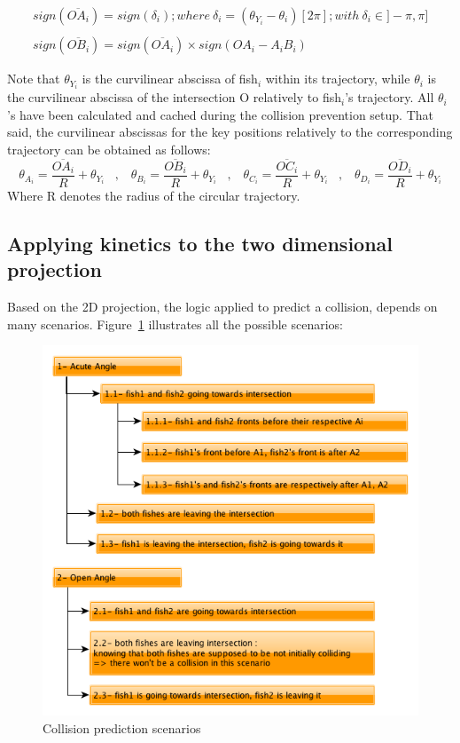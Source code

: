 \begin{gather*}
sign(\overline{OA_i}) = sign(\delta_i); where\: \delta_i = (\theta_{Y_i} - \theta_i) [2\pi]; with \: \delta_i \in ]-\pi, \pi]\\\\
sign(\overline{OB_i}) = sign(\overline{OA_i}) \times sign(OA_i - A_iB_i)
\end{gather*}

Note that $\theta_{Y_i}$ is the curvilinear abscissa of fish$_i$ within its trajectory, while $\theta_i$ is the curvilinear abscissa of the intersection O relatively to fish$_i$'s trajectory. All $\theta_i$'s have been calculated and cached during the collision prevention setup. That said, the curvilinear abscissas for the key positions relatively to the corresponding trajectory can be obtained as follows:
\[
\theta_{A_i} = \frac{\overline{OA_i}}{R} + \theta_{Y_i} \;\;\; , \;\;\; \theta_{B_i} = \frac{\overline{OB_i}}{R} + \theta_{Y_i} \;\;\; , \;\;\; \theta_{C_i} = \frac{\overline{OC_i}}{R} + \theta_{Y_i} \;\;\; , \;\;\; \theta_{D_i} = \frac{\overline{OD_i}}{R} + \theta_{Y_i}
\]
Where R denotes the radius of the circular trajectory.

\subsection{Applying kinetics to the two dimensional projection}
\label{subsec:kinetics}

Based on the 2D projection, the logic applied to predict a collision, depends on many scenarios. Figure~\ref{fig:prediction-scenarios} illustrates all the possible scenarios:

\begin{figure}[H]
   \centering
   \includegraphics[scale=0.75]{figures/prediction-scenarios.png}
   \caption{Collision prediction scenarios}
   \label{fig:prediction-scenarios}
\end{figure}

